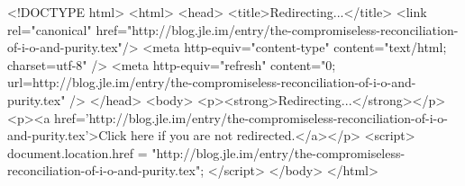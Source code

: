 <!DOCTYPE html>
<html>
<head>
<title>Redirecting...</title>
<link rel="canonical" href="http://blog.jle.im/entry/the-compromiseless-reconciliation-of-i-o-and-purity.tex"/>
<meta http-equiv="content-type" content="text/html; charset=utf-8" />
<meta http-equiv="refresh" content="0; url=http://blog.jle.im/entry/the-compromiseless-reconciliation-of-i-o-and-purity.tex" />
</head>
<body>
  <p><strong>Redirecting...</strong></p>
  <p><a href='http://blog.jle.im/entry/the-compromiseless-reconciliation-of-i-o-and-purity.tex'>Click here if you are not redirected.</a></p>
  <script>
    document.location.href = "http://blog.jle.im/entry/the-compromiseless-reconciliation-of-i-o-and-purity.tex";
  </script>
</body>
</html>
